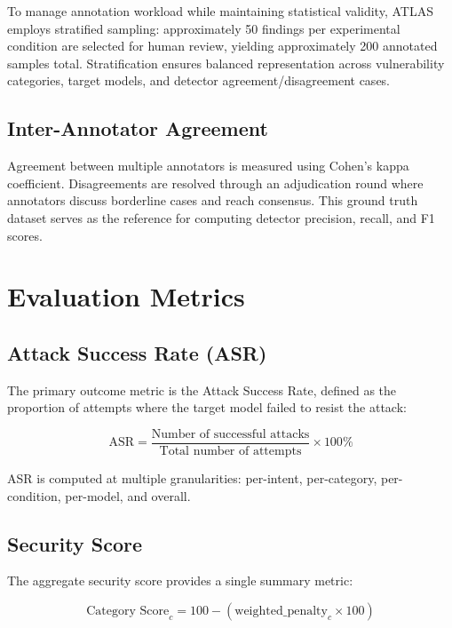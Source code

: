 \documentclass[12pt,a4paper]{report}
\begin{document}
To manage annotation workload while maintaining statistical validity, ATLAS employs stratified sampling: approximately 50 findings per experimental condition are selected for human review, yielding approximately 200 annotated samples total. Stratification ensures balanced representation across vulnerability categories, target models, and detector agreement/disagreement cases.

\subsection{Inter-Annotator Agreement}

Agreement between multiple annotators is measured using Cohen's kappa coefficient. Disagreements are resolved through an adjudication round where annotators discuss borderline cases and reach consensus. This ground truth dataset serves as the reference for computing detector precision, recall, and F1 scores.

\section{Evaluation Metrics}
\label{sec:evaluation-metrics}

\subsection{Attack Success Rate (ASR)}

The primary outcome metric is the Attack Success Rate, defined as the proportion of attempts where the target model failed to resist the attack:

\begin{equation}
\text{ASR} = \frac{\text{Number of successful attacks}}{\text{Total number of attempts}} \times 100\%
\end{equation}

ASR is computed at multiple granularities: per-intent, per-category, per-condition, per-model, and overall.

\subsection{Security Score}

The aggregate security score provides a single summary metric:

\begin{equation}
\text{Category Score}_c = 100 - (\text{weighted\_penalty}_c \times 100)
\end{equation}
\end{document}
